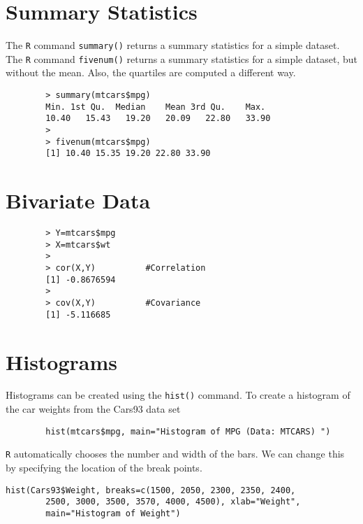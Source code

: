 \documentclass[a4paper,12pt]{article}
\begin{document}
	
	\section{Summary Statistics}
	The \texttt{R} command \texttt{summary()} returns a summary statistics for a simple dataset.
	The \texttt{R} command \texttt{fivenum()} returns a summary statistics for a simple dataset, but without the mean.
	Also, the quartiles are computed a different way.
	
	\large
	\begin{framed}
		\begin{verbatim}
		> summary(mtcars$mpg)
		Min. 1st Qu.  Median    Mean 3rd Qu.    Max.
		10.40   15.43   19.20   20.09   22.80   33.90 
		>
		> fivenum(mtcars$mpg)
		[1] 10.40 15.35 19.20 22.80 33.90
		\end{verbatim}
	\end{framed}
	\large
	
	
	
	
	\section{Bivariate Data}
	\large \begin{framed}
		\begin{verbatim}
		> Y=mtcars$mpg
		> X=mtcars$wt
		>
		> cor(X,Y)          #Correlation
		[1] -0.8676594
		>
		> cov(X,Y)          #Covariance
		[1] -5.116685
		\end{verbatim}
	\end{framed}\large
	
	
	\section{Histograms}
	Histograms can be created using the \texttt{hist()} command.
	To create a histogram of the car weights from the Cars93 data set
	\large
	\begin{framed}
		\begin{verbatim}
		hist(mtcars$mpg, main="Histogram of MPG (Data: MTCARS) ")
		\end{verbatim}
	\end{framed}\large
	\texttt{R} automatically chooses the number and width of the bars. We can
	change this by specifying the location of the break points.
	\large
	\begin{framed}
		\begin{verbatim}hist(Cars93$Weight, breaks=c(1500, 2050, 2300, 2350, 2400,
		2500, 3000, 3500, 3570, 4000, 4500), xlab="Weight",
		main="Histogram of Weight")
		\end{verbatim}
	\end{framed}\large
	
\end{document}
